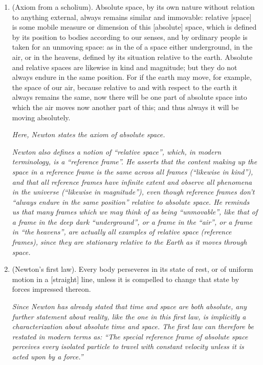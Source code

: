 \documentclass{article}
\begin{document}
\begin{enumerate}
	\item (Axiom from a scholium). Absolute space, by its own nature without relation to anything external, always remains similar and immovable: relative [space] is some mobile measure or dimension of this [absolute] space, which is defined by its position to bodies according to our senses, and by ordinary people is taken for an unmoving space: as in the of a space either underground, in the air, or in the heavens, defined by its situation relative to the earth. Absolute and relative spaces are likewise in kind and magnitude; but they do not always endure in the same position. For if the earth may move, for example, the space of our air, because relative to and with respect to the earth it always remains the same, now there will be one part of absolute space into which the air moves now another part of this; and thus always it will be moving absolutely. 
	
	\textit{Here, Newton states the axiom of absolute space.}
	
	\textit{Newton also defines a notion of ``relative space'', which, in modern terminology, is a ``reference frame''. He asserts that the content making up the space in a reference frame is the same across all frames (``likewise in kind''), and that all reference frames have infinite extent and observe all phenomena in the universe (``likewise in magnitude''), even though reference frames don't ``always endure in the same position'' relative to absolute space. He reminds us that many frames which we may think of as being ``unmovable'', like that of a frame in the deep dark ``underground'', or a frame in the ``air'', or a frame in ``the heavens'', are actually all examples of relative space (reference frames), since they are stationary relative to the Earth as it moves through space.}
	
	\item (Newton's first law). Every body perseveres in its state of rest, or of uniform motion in a [straight] line, unless it is compelled to change that state by forces impressed thereon.
	
	\textit{Since Newton has already stated that time and space are both absolute, any further statement about reality, like the one in this first law, is implicitly a characterization about absolute time and space. The first law can therefore be restated in modern terms as: ``The special reference frame of absolute space perceives every isolated particle to travel with constant velocity unless it is acted upon by a force.''}
	

\end{enumerate}
\end{document}
